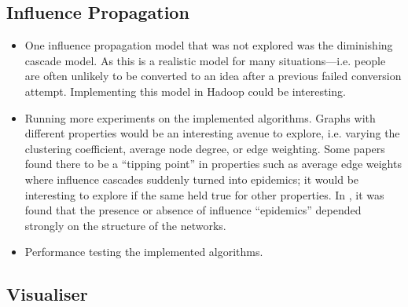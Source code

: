\subsection{Influence Propagation}

\begin{itemize}
	\item One influence propagation model that was not explored was the diminishing cascade model. As this is a realistic model for many situations---i.e. people are often unlikely to be converted to an idea after a previous failed conversion attempt. Implementing this model in Hadoop could be interesting.
	\item Running more experiments on the implemented algorithms. Graphs with different properties would be an interesting avenue to explore, i.e. varying the clustering coefficient, average node degree, or edge weighting. Some papers found there to be a ``tipping point'' in properties such as average edge weights where influence cascades suddenly turned into epidemics; it would be interesting to explore if the same held true for other properties. In \cite{digg}, it was found that the presence or absence of influence ``epidemics'' depended strongly on the structure of the networks.
	\item Performance testing the implemented algorithms.
\end{itemize}

\subsection{Visualiser}

